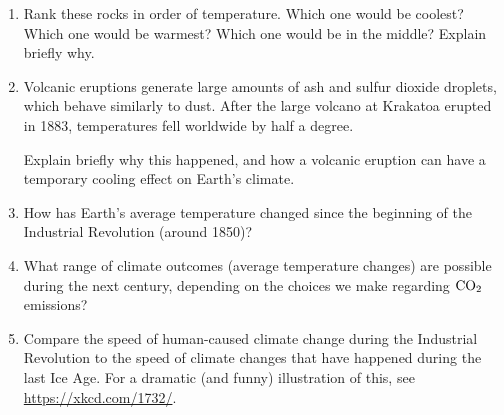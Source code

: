 \documentclass[12pt]{article}
\begin{document}
\begin{enumerate}
    \item Rank these rocks in order of temperature. Which one would be coolest? Which one would be warmest? Which one would be in the middle? Explain briefly why.
    
    \vspace{2in}

\newpage

    \item Volcanic eruptions generate large amounts of ash and sulfur dioxide droplets, which behave similarly to dust. After the large volcano at Krakatoa erupted in 1883, temperatures fell worldwide by half a degree.

	\bigskip

	Explain briefly why this happened, and how a volcanic eruption can have a temporary cooling effect on Earth's climate.
    \vspace{2.5in}
    
 
    \item How has Earth's average temperature changed since the beginning of the Industrial Revolution (around 1850)?
    \vspace{1in}
    \item What range of climate outcomes (average temperature changes) are possible during the next century, depending on the choices we make regarding $\rm CO_2$ emissions?
    \vspace{1.5in}
    \item Compare the speed of human-caused climate change during the Industrial Revolution to the speed of climate changes that have happened during the last Ice Age. For a dramatic (and funny) illustration of this, see \url{https://xkcd.com/1732/}.
\end{enumerate}
\end{document}
